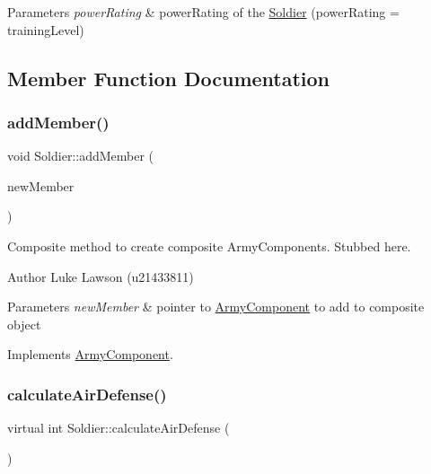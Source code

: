 \begin{DoxyParams}{Parameters}
{\em power\+Rating} & power\+Rating of the \mbox{\hyperlink{class_soldier}{Soldier}} (power\+Rating = training\+Level) \\
\hline
\end{DoxyParams}


\subsection{Member Function Documentation}
\mbox{\label{class_soldier_af158cf7ebb1fbf27d4b46c272de60803}} 
\subsubsection{\texorpdfstring{addMember()}{addMember()}}
{\footnotesize\ttfamily void Soldier\+::add\+Member (\begin{DoxyParamCaption}\item[{\mbox{\hyperlink{class_army_component}{Army\+Component}} $\ast$}]{new\+Member }\end{DoxyParamCaption})\hspace{0.3cm}{\ttfamily [virtual]}}



Composite method to create composite Army\+Components. Stubbed here. 

\begin{DoxyAuthor}{Author}
Luke Lawson (u21433811) 
\end{DoxyAuthor}

\begin{DoxyParams}{Parameters}
{\em new\+Member} & pointer to \mbox{\hyperlink{class_army_component}{Army\+Component}} to add to composite object \\
\hline
\end{DoxyParams}


Implements \mbox{\hyperlink{class_army_component_aae30fdd85af73102e011cb053ddb96b3}{Army\+Component}}.

\mbox{\label{class_soldier_a3dc2d7a06621380c4561d330d5359dc2}} 
\subsubsection{\texorpdfstring{calculateAirDefense()}{calculateAirDefense()}}
{\footnotesize\ttfamily virtual int Soldier\+::calculate\+Air\+Defense (\begin{DoxyParamCaption}{ }\end{DoxyParamCaption})\hspace{0.3cm}{\ttfamily [pure virtual]}}



